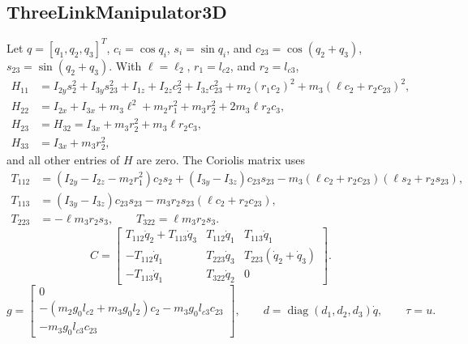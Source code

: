 \documentclass[11pt]{article}
\newcommand{\diag}{\operatorname{diag}}
\begin{document}
\subsection{ThreeLinkManipulator3D}
Let \(q=[q_1,q_2,q_3]^T\), \(c_i=\cos q_i\), \(s_i=\sin q_i\), and
\(c_{23}=\cos(q_2+q_3)\), \(s_{23}=\sin(q_2+q_3)\).  With
\(\ell=\ell_2\), \(r_1=l_{c2}\), and \(r_2=l_{c3}\),
\begin{align}
    H_{11} &=
        I_{2y}s_2^2 + I_{3y}s_{23}^2 + I_{1z}
        + I_{2z}c_2^2 + I_{3z}c_{23}^2
        + m_2(r_1c_2)^2 + m_3(\ell c_2+r_2c_{23})^2,\\
    H_{22} &=
        I_{2x}+I_{3x}+m_3\ell^2+m_2r_1^2+m_3r_2^2
        +2m_3\ell r_2c_3,\\
    H_{23} &= H_{32}=I_{3x}+m_3r_2^2+m_3\ell r_2c_3,\\
    H_{33} &= I_{3x}+m_3r_2^2,
\end{align}
and all other entries of \(H\) are zero.  The Coriolis matrix uses
\begin{align}
    T_{112} &=
        (I_{2y}-I_{2z}-m_2r_1^2)c_2s_2
        +(I_{3y}-I_{3z})c_{23}s_{23}
        -m_3(\ell c_2+r_2c_{23})(\ell s_2+r_2s_{23}),\\
    T_{113} &=
        (I_{3y}-I_{3z})c_{23}s_{23}
        -m_3r_2s_{23}(\ell c_2+r_2c_{23}),\\
    T_{223} &=-\ell m_3r_2s_3,
    \qquad
    T_{322}=\ell m_3r_2s_3.
\end{align}
\begin{equation}
    C =
    \begin{bmatrix}
        T_{112}\dot q_2+T_{113}\dot q_3&T_{112}\dot q_1&T_{113}\dot q_1\\
        -T_{112}\dot q_1&T_{223}\dot q_3&T_{223}(\dot q_2+\dot q_3)\\
        -T_{113}\dot q_1&T_{322}\dot q_2&0
    \end{bmatrix}.
\end{equation}
\begin{equation}
    g =
    \begin{bmatrix}
        0\\
        -(m_2g_0l_{c2}+m_3g_0l_2)c_2-m_3g_0l_{c3}c_{23}\\
        -m_3g_0l_{c3}c_{23}
    \end{bmatrix},
    \qquad
    d=\diag(d_1,d_2,d_3)\dot q,
    \qquad
    \tau=u.
\end{equation}
\end{document}
